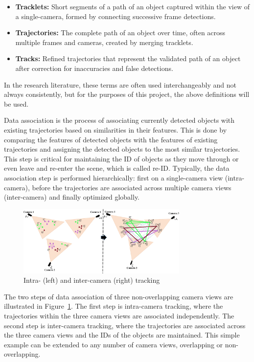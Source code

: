 \begin{itemize}
    \item \textbf{Tracklets:} Short segments of a path of an object captured within the view of a single-camera, formed by connecting successive frame detections.
    \item \textbf{Trajectories:} The complete path of an object over time, often across multiple frames and cameras, created by merging tracklets.
    \item \textbf{Tracks:} Refined trajectories that represent the validated path of an object after correction for inaccuracies and false detections.
\end{itemize}

In the research literature, these terms are often used interchangeably and not always consistently, but for the purposes of this project, the above definitions will be used.

Data association is the process of associating currently detected objects with existing trajectories based on similarities in their features. This is done by comparing the features of detected objects with the features of existing trajectories and assigning the detected objects to the most similar trajectories. This step is critical for maintaining the ID of objects as they move through or even leave and re-enter the scene, which is called re-ID. Typically, the data association step is performed hierarchically: first on a single-camera view (intra-camera), before the trajectories are associated across multiple camera views (inter-camera) and finally optimized globally.

\begin{figure}[ht]
    \centering
    \includegraphics[width=0.75\textwidth]{resources/fig/Tesfaye19-intra_inter_camera_tracking.png}
    \caption{Intra- (left) and inter-camera (right) tracking~\cite[Fig.~1]{Tesfaye19}}\label{fig:intra_inter_camera_tracking}
\end{figure}

The two steps of data association of three non-overlapping camera views are illustrated in Figure~\ref{fig:intra_inter_camera_tracking}. The first step is intra-camera tracking, where the trajectories within the three camera views are associated independently. The second step is inter-camera tracking, where the trajectories are associated across the three camera views and the IDs of the objects are maintained. This simple example can be extended to any number of camera views, overlapping or non-overlapping.

